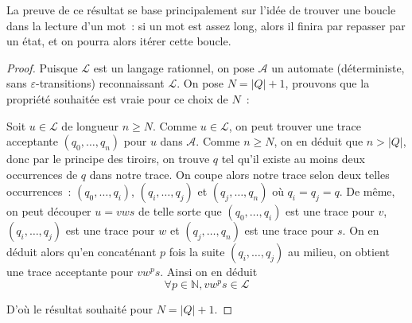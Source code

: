 La preuve de ce résultat se base principalement sur l'idée de trouver une boucle
dans la lecture d'un mot~: si un mot est assez long, alors il finira par
repasser par un état, et on pourra alors itérer cette boucle.

\begin{figure}[h]
  \centering
\end{figure}

\begin{proof}
  Puisque $\mathcal L$ est un langage rationnel, on pose $\mathcal A$ un
  automate (déterministe, sans $\varepsilon$-transitions) reconnaissant
  $\mathcal L$. On pose $N = |Q| + 1$, prouvons que la propriété souhaitée est
  vraie pour ce choix de $N$~:

  Soit $u\in\mathcal L$ de longueur $n \geq N$. Comme $u \in \mathcal L$, on
  peut trouver une trace acceptante $(q_0,\ldots,q_n)$ pour $u$ dans
  $\mathcal A$. Comme $n \geq N$, on en déduit que $n > |Q|$, donc par le
  principe des tiroirs, on trouve $q$ tel qu'il existe au moins deux occurrences
  de $q$ dans notre trace. On coupe alors notre trace selon deux telles
  occurrences~: $(q_0,\ldots,q_i)$, $(q_i,\ldots,q_j)$ et $(q_j,\ldots,q_n)$
  où $q_i = q_j = q$. De même, on peut découper $u = vws$ de telle sorte que
  $(q_0,\ldots,q_i)$ est une trace pour $v$, $(q_i,\ldots,q_j)$ est une trace
  pour $w$ et $(q_j,\ldots,q_n)$ est une trace pour $s$. On en déduit alors
  qu'en concaténant $p$ fois la suite $(q_i,\ldots,q_j)$ au milieu, on obtient
  une trace acceptante pour $vw^ps$. Ainsi on en déduit
  \[\forall p \in \mathbb N, vw^ps\in \mathcal L\]

  D'où le résultat souhaité pour $N = |Q| + 1$.
\end{proof}

